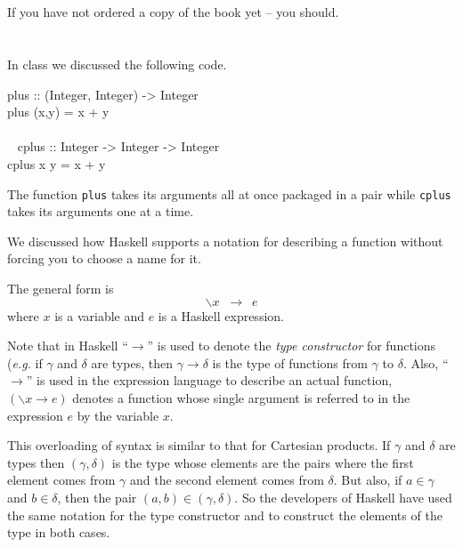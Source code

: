 \documentclass[11pt]{article}
\begin{document}

\section{}


If you have not ordered a copy of the book yet -- you
should.  

\section{}
In class we discussed the following code.

\begin{program*}

\> plus :: (Integer, Integer) -> Integer \\
\> plus (x,y) = x + y \\
\>   \\\
\> cplus :: Integer -> Integer -> Integer \\
\> cplus x y = x + y \\
\end{program*}


The function {\tt{plus}} takes its arguments all at once packaged in a pair
while {\tt{cplus}} takes its arguments one at a time.

We discussed how Haskell supports a notation for describing a function without
forcing you to choose a name for it.

The general form is 
\[ \backslash x \;\;\rightarrow\:\; e \]
where $x$ is a variable and $e$ is a Haskell expression.

Note that in Haskell ``$\rightarrow$'' is used to denote the {\em{type
constructor}} for functions ({\em{e.g.}} if $\gamma$ and $\delta$ are types,
then $\gamma \rightarrow \delta$ is the type of functions from $\gamma$ to
$\delta$.  Also, ``$\rightarrow$'' is used in the expression language to
describe an actual function, $(\backslash x \rightarrow e)$ denotes a function
whose single argument is referred to in the expression $e$ by the variable $x$.

This overloading of syntax is similar to that for Cartesian products.  If
$\gamma$ and $\delta$ are types then $(\gamma,\delta)$ is the type whose
elements are the pairs where the first element comes from $\gamma$ and the
second element comes from $\delta$. But also, if $a\in\gamma$ and $b\in\delta$,
then the pair $(a,b)\in(\gamma,\delta)$.  So the developers of Haskell have
used the same notation for the type constructor and to construct the elements
of the type in both cases.
\end{document}
